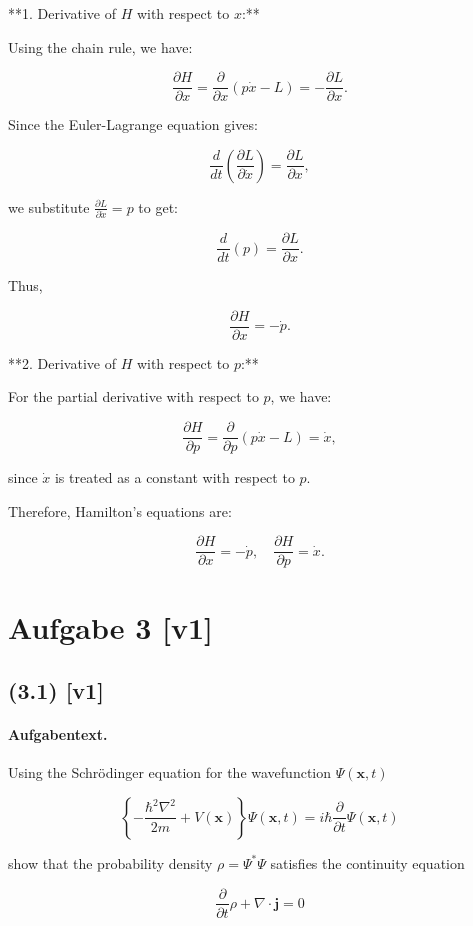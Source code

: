 \documentclass[11pt,a4paper]{article}
\begin{document}
**1. Derivative of \( H \) with respect to \( x \):**

Using the chain rule, we have:

$$
\frac{\partial H}{\partial x} = \frac{\partial}{\partial x} (p \dot{x} - L) = -\frac{\partial L}{\partial x}.
$$

Since the Euler-Lagrange equation gives:

$$
\frac{d}{dt} \left( \frac{\partial L}{\partial \dot{x}} \right) = \frac{\partial L}{\partial x},
$$

we substitute \( \frac{\partial L}{\partial \dot{x}} = p \) to get:

$$
\frac{d}{dt}(p) = \frac{\partial L}{\partial x}.
$$

Thus,

$$
\frac{\partial H}{\partial x} = -\dot{p}.
$$

**2. Derivative of \( H \) with respect to \( p \):**

For the partial derivative with respect to \( p \), we have:

$$
\frac{\partial H}{\partial p} = \frac{\partial}{\partial p} (p \dot{x} - L) = \dot{x},
$$

since \( \dot{x} \) is treated as a constant with respect to \( p \).

Therefore, Hamilton's equations are:

$$
\frac{\partial H}{\partial x} = -\dot{p}, \quad \frac{\partial H}{\partial p} = \dot{x}.
$$

\section*{Aufgabe 3 [v1]}
\subsection*{(3.1) [v1]}
\paragraph{Aufgabentext.}
Using the Schrödinger equation for the wavefunction $\Psi(\mathbf{x}, t)$

$$
\left\{-\frac{\hbar^2 \nabla^2}{2 m}+V(\mathbf{x})\right\} \Psi(\mathbf{x}, t)=i \hbar \frac{\partial}{\partial t} \Psi(\mathbf{x}, t)
$$

show that the probability density $\rho=\Psi^* \Psi$ satisfies the continuity equation

$$
\frac{\partial}{\partial t} \rho+\nabla \cdot \mathbf{j}=0
$$
\end{document}
